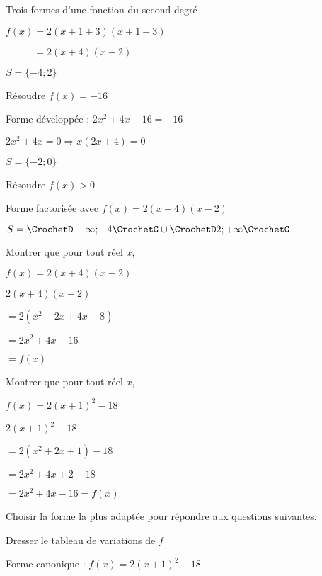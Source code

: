 \begin{EXO}{Trois formes d'une fonction du second degré}{}
\begin{tcbenumerate}[2][3]
\begin{tcbenumerate}[2][1][alph]
\begin{crep}
$f(x) = 2(x+1+3)(x+1-3) $

$\phantom{f(x)}= 2(x+4)(x-2)$

$S = \{-4 ; 2\}$
\end{crep}

\tcbitem {} Résoudre $f(x)=-16$

\begin{crep}
Forme développée : $2x^2+4x-16 = -16$

$2x^2+4x = 0 \Rightarrow x(2x+4) = 0$

$S = \{-2 ; 0\}$
\end{crep}

\tcbitem {} Résoudre $f(x)>0$

\begin{crep}
Forme factorisée avec $f(x) = 2(x+4)(x-2)$

$S = \CrochetD-\infty;-4\CrochetG \cup \CrochetD2;+\infty\CrochetG$
\end{crep}
\end{tcbenumerate}
\end{tcbenumerate}

\exocorrection

\begin{tcbenumerate}[2]
\tcbitem {} Montrer que pour tout réel $x$, 
\vspace{-0.3cm}\begin{center}$f(x) = 2(x+4)(x-2)$\end{center}
\begin{crep}
$2(x+4)(x-2) $

$= 2(x^2-2x+4x-8 ) $

$= 2x^2+ 4x -16 $

$= f(x)$

\end{crep}

\tcbitem {} Montrer que pour tout réel $x$, 
\vspace{-0.3cm}\begin{center}$f(x) = 2(x+1)^2-18$\end{center}
\begin{crep}
$2(x+1)^2-18 $

$= 2(x^2+2x+1)-18 $

$= 2x^2+4x+2-18 $

$= 2x^2+4x-16= f(x)$ 
\end{crep}
\end{tcbenumerate}
\begin{tcbenumerate}[2][3]
\tcbitem[colframe=black,boxrule=0.4pt,raster multicolumn=2] Choisir la forme la plus adaptée pour répondre aux questions suivantes.
\begin{tcbenumerate}[2][1][alph]
\tcbitem {} Dresser le tableau de variations de $f$
\begin{crep}[colback=white,colframe=white]%
Forme canonique : $f(x) = 2(x+1)^2-18$\\\\


\end{crep}
\end{tcbenumerate}
\end{tcbenumerate}
\end{EXO}

